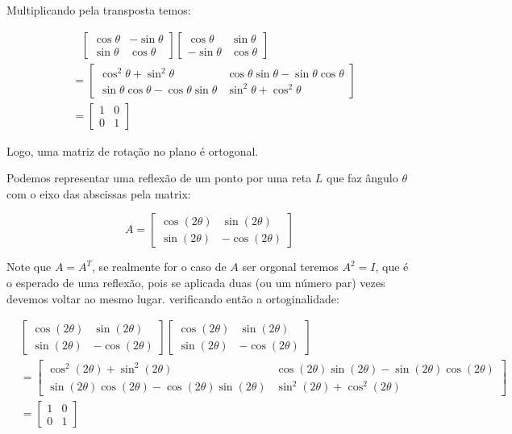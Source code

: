 \documentclass[12pt,letterpaper]{article}
\begin{document}
\begin{enumerate}
	Multiplicando pela transposta temos:
	
	\begin{align*}
		&~~~\,\begin{bmatrix}
			\cos \theta &-\sin\theta\\
			\sin\theta &\cos\theta
		\end{bmatrix}\begin{bmatrix}
		\cos \theta &\sin\theta\\
		-\sin\theta &\cos\theta
	\end{bmatrix}\\&=\begin{bmatrix}
	\cos^2 \theta +\sin^2\theta&\cos\theta\sin\theta-\sin\theta\cos\theta\\
	\sin\theta\cos\theta-\cos\theta\sin\theta &\sin^2\theta+\cos^2\theta
\end{bmatrix}\\&=\begin{bmatrix}
1 &0\\
0 &1
\end{bmatrix}
	\end{align*}

	Logo, uma matriz de rotação no plano é ortogonal.
	
	Podemos representar uma reflexão de um ponto por uma reta $L$ que faz ângulo $\theta$ com o eixo das abscissas pela matrix\cite{wiki:Rotations_and_reflections_in_two_dimensions}: 
	
	$$A=\begin{bmatrix}
		\cos(2\theta)&\sin(2\theta)\\
		\sin(2\theta)&-\cos(2\theta)
	\end{bmatrix}$$

	Note que $A=A^T$, se realmente for o caso de $A$ ser orgonal teremos $A^2=I$, que é o esperado de uma reflexão, pois se aplicada duas (ou um número par) vezes devemos voltar ao mesmo lugar. verificando então a ortoginalidade:
	
	\begin{align*}
		&\begin{bmatrix}
			\cos(2\theta)&\sin(2\theta)\\
			\sin(2\theta)&-\cos(2\theta)
		\end{bmatrix}\begin{bmatrix}
		\cos(2\theta)&\sin(2\theta)\\
		\sin(2\theta)&-\cos(2\theta)
	\end{bmatrix}\\
	&=\begin{bmatrix}
		\cos^2 (2\theta) +\sin^2(2\theta)&\cos(2\theta)\sin(2\theta)-\sin(2\theta)\cos(2\theta)\\
		\sin(2\theta)\cos(2\theta)-\cos(2\theta)\sin(2\theta) &\sin^2(2\theta)+\cos^2(2\theta)
	\end{bmatrix}\\&=\begin{bmatrix}
		1 &0\\
		0 &1
	\end{bmatrix}
	\end{align*} 


\end{enumerate}
\end{document}
